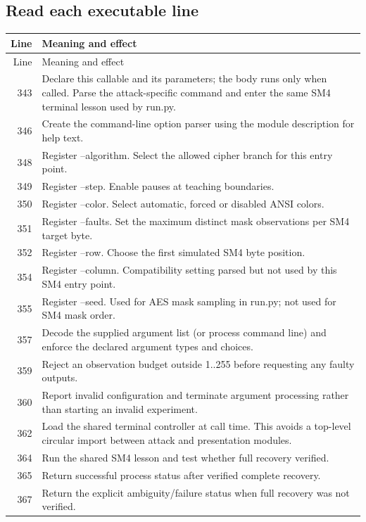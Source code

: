 \subsection*{Read each executable line}
\begingroup\small\begin{longtable}{r >{\raggedright\arraybackslash}p{138mm}}\toprule Line&Meaning and effect\\\midrule\endfirsthead\toprule Line&Meaning and effect\\\midrule\endhead
343&Declare this callable and its parameters; the body runs only when called. Parse the attack-specific command and enter the same SM4 terminal lesson used by run.py.\\
346&Create the command-line option parser using the module description for help text.\\
348&Register --algorithm. Select the allowed cipher branch for this entry point.\\
349&Register --step. Enable pauses at teaching boundaries.\\
350&Register --color. Select automatic, forced or disabled ANSI colors.\\
351&Register --faults. Set the maximum distinct mask observations per SM4 target byte.\\
352&Register --row. Choose the first simulated SM4 byte position.\\
354&Register --column. Compatibility setting parsed but not used by this SM4 entry point.\\
355&Register --seed. Used for AES mask sampling in run.py; not used for SM4 mask order.\\
357&Decode the supplied argument list (or process command line) and enforce the declared argument types and choices.\\
359&Reject an observation budget outside 1..255 before requesting any faulty outputs.\\
360&Report invalid configuration and terminate argument processing rather than starting an invalid experiment.\\
362&Load the shared terminal controller at call time. This avoids a top-level circular import between attack and presentation modules.\\
364&Run the shared SM4 lesson and test whether full recovery verified.\\
365&Return successful process status after verified complete recovery.\\
367&Return the explicit ambiguity/failure status when full recovery was not verified.\\
\bottomrule\end{longtable}\endgroup
